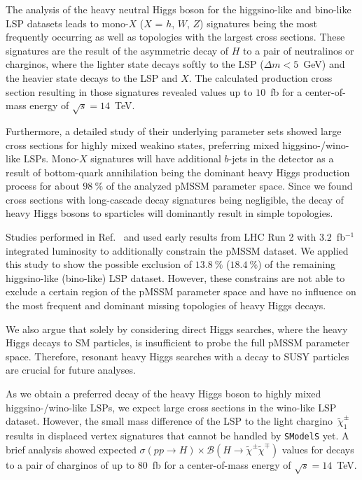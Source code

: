 \documentclass[11pt,a4paper]{article}
\begin{document}
The analysis of the heavy neutral Higgs boson for the higgsino-like and bino-like LSP datasets leads to mono-$X$ ($X$ = $h$, $W$, $Z$) signatures being the most frequently occurring as well as topologies with the largest cross sections. These signatures are the result of the asymmetric decay of $H$ to a pair of neutralinos or charginos, where the lighter state decays softly to the LSP ($\Delta m < 5$~GeV) and the heavier state decays to the LSP and $X$. The calculated production cross section resulting in those signatures revealed values up to $10$~fb for a center-of-mass energy of $\sqrt{s}=14$~TeV. 

Furthermore, a detailed study of their underlying parameter sets showed large cross sections for highly mixed weakino states, preferring mixed higgsino-/wino-like LSPs. Mono-$X$ signatures will have additional $b$-jets in the detector as a result of bottom-quark annihilation being the dominant heavy Higgs production process for about $98~\%$ of the analyzed pMSSM parameter space. Since we found cross sections with long-cascade decay signatures being negligible, the decay of heavy Higgs bosons to sparticles will dominantly result in simple topologies.

Studies performed in Ref.~\cite{Barr:2016inz} and \cite{Barr:2016sho} used early results from LHC Run 2 with $3.2$~fb$^{-1}$ integrated luminosity to additionally constrain the pMSSM dataset. We applied this study to show the possible exclusion of $13.8~\%$ ($18.4~\%$) of the remaining higgsino-like (bino-like) LSP dataset. However, these constrains are not able to exclude a certain region of the pMSSM parameter space and have no influence on the most frequent and dominant missing topologies of heavy Higgs decays.

We also argue that solely by considering direct Higgs searches, where the heavy Higgs decays to SM particles, is insufficient to probe the full pMSSM parameter space. Therefore, resonant heavy Higgs searches with a decay to SUSY particles are crucial for future analyses.

As we obtain a preferred decay of the heavy Higgs boson to highly mixed higgsino-/wino-like LSPs, we expect large cross sections in the wino-like LSP dataset. However, the small mass difference of the LSP to the light chargino~$\tilde{\chi}_1^\pm$ results in displaced vertex signatures that cannot be  handled by \texttt{SModelS} yet. A brief analysis showed expected $\sigma(pp\rightarrow H)\times\mathcal{B}(H\rightarrow \tilde{\chi}^\pm\tilde{\chi}^\mp)$ values for decays to a pair of charginos of up to $80$~fb for a center-of-mass energy of $\sqrt{s}=14$~TeV. 
\end{document}
